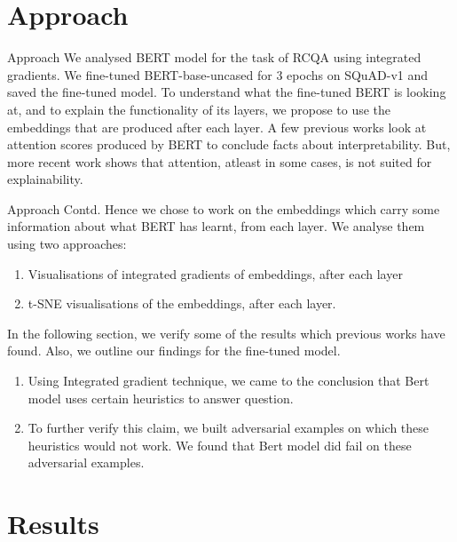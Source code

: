 \documentclass[10pt]{beamer}
\begin{document}
\section{Approach}
\begin{frame}{Approach}
We analysed BERT model for the task of RCQA using integrated gradients. We fine-tuned BERT-base-uncased for 3 epochs on SQuAD-v1 and saved the fine-tuned model. To understand what the fine-tuned BERT is looking at, and to explain the functionality of its layers, we propose to use the embeddings that are produced after each layer. A few previous works look at attention scores produced by BERT to conclude facts about interpretability. But, more recent work \cite{at_not_exp} shows that attention, atleast in some cases, is not suited for explainability.
\end{frame}

\begin{frame}{Approach Contd.}
 Hence we chose to work on the embeddings which carry some information about what BERT has learnt, from each layer. We analyse them using two approaches:
\begin{enumerate}
    \item Visualisations of integrated gradients of embeddings, after each layer
    \item t-SNE visualisations of the embeddings, after each layer.
\end{enumerate}
In the following section, we verify some of the results which previous works have found. Also, we outline our findings for the fine-tuned model.
\begin{enumerate}
    \item Using Integrated gradient technique, we came to the conclusion that Bert model uses certain heuristics to answer question.
    \item To further verify this claim, we built adversarial examples on which these heuristics would not work. We found that Bert model did fail on these adversarial examples.
\end{enumerate}
\end{frame}

\section{Results}
\end{document}
